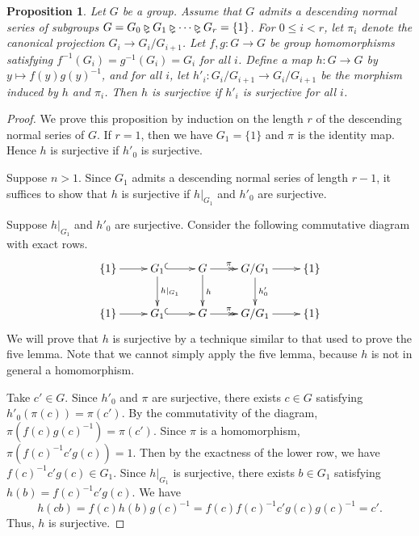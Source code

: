 \documentclass[10pt,a4paper]{amsart}
\numberwithin{equation}{section}
\newcommand{\trianglerightneq}{\mathrel{\ooalign{\raisebox{-0.5ex}{\reflectbox{\rotatebox{90}{$\nshortmid$}}}\cr$\triangleright$\cr}\mkern-3mu}}
\theoremstyle{plain}
\newtheorem{prop}[theo]{Proposition}
\theoremstyle{definition}
\begin{document}
\begin{prop}\label{pa}
   Let $G$ be a group. Assume that $G$ admits a descending normal series of subgroups $G=G_0\trianglerightneq G_1\trianglerightneq\cdots\trianglerightneq G_r=\{1\}$. For $0\leq i<r$, let $\pi_i$ denote the canonical projection $G_i\to G_i/G_{i+1}$. Let $f,g:G\to G$ be group homomorphisms satisfying $f^{-1}(G_i)=g^{-1}(G_i)=G_i$ for all $i$. Define a map $h:G\to G$ by $y\mapsto f(y)g(y)^{-1}$, and for all $i$, let $h'_i:G_i/G_{i+1}\to G_i/G_{i+1}$ be the morphism induced by $h$ and $\pi_i$. Then $h$ is surjective if $h'_i$ is surjective for all $i$.
\end{prop}

\begin{proof} We prove this proposition by induction on the length $r$ of the descending normal series of $G$. If $r=1$, then we have $G_1=\{1\}$ and $\pi$ is the identity map. Hence $h$ is surjective if $h'_0$ is surjective.

Suppose $n>1$. Since $G_1$ admits a descending normal series of length $r-1$, it suffices to show that $h$ is surjective if $h|_{G_1}$ and $h'_0$ are surjective.

Suppose $h|_{G_1}$ and $h'_0$ are surjective. Consider the following commutative diagram with exact rows.
\begin{equation}
    \xymatrix{
      \{1\}\ar[r]&G_1\ar@{^{(}->}[r]\ar[d]^{h|_{G_1}}&G\ar@{->>}[r]^{\pi}\ar[d]^{h}&G/G_1\ar[r]\ar[d]^{h'_0}&\{1\}\\
      \{1\}\ar[r]&G_1\ar@{^{(}->}[r]&G\ar@{->>}[r]^{\pi}&G/G_1\ar[r]&\{1\}
    }
    \end{equation}
We will prove that $h$ is surjective by a technique similar to that used to prove the five lemma. Note that we cannot simply apply the five lemma, because $h$ is not in general a homomorphism.

Take $c'\in G$. Since $h'_0$ and $\pi$ are surjective, there exists $c\in G$ satisfying $h'_0(\pi(c))=\pi(c')$. By the commutativity of the diagram, $\pi(f(c)g(c)^{-1})=\pi(c')$. Since $\pi$ is a homomorphism, $\pi(f(c)^{-1}c'g(c))=1$. Then by the exactness of the lower row, we have $f(c)^{-1}c'g(c)\in G_1$. Since $h|_{G_1}$ is surjective, there exists $b\in G_1$ satisfying $h(b)=f(c)^{-1}c'g(c)$. We have
\begin{equation}
h(cb)=f(c)h(b)g(c)^{-1}=f(c)f(c)^{-1}c'g(c)g(c)^{-1}=c'.
\end{equation}
Thus, $h$ is surjective.
\end{proof}
\end{document}
